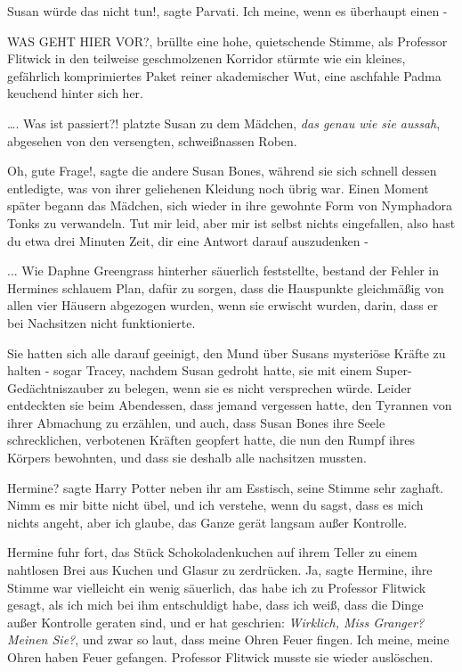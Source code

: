 \glqq{}Susan würde das nicht tun!\grqq{}, sagte Parvati. \glqq{}Ich meine, wenn es
überhaupt einen -\grqq{}

\glqq{}WAS GEHT HIER VOR?\grqq{}, brüllte eine hohe, quietschende Stimme, als
Professor Flitwick in den teilweise geschmolzenen Korridor stürmte wie ein
kleines, gefährlich komprimiertes Paket reiner akademischer Wut, eine aschfahle
Padma keuchend hinter sich her.

…. \glqq{}Was ist passiert?!\grqq{} platzte Susan zu dem Mädchen, \emph{das genau
wie sie aussah}, abgesehen von den versengten, schweißnassen Roben.

\glqq{}Oh, gute Frage!\grqq{}, sagte die andere Susan Bones, während sie sich
schnell dessen entledigte, was von ihrer geliehenen Kleidung noch übrig war.
Einen Moment später begann das Mädchen, sich wieder in ihre gewohnte Form von
Nymphadora Tonks zu verwandeln. \glqq{}Tut mir leid, aber mir ist selbst nichts
eingefallen, also hast du etwa drei Minuten Zeit, dir eine Antwort darauf
auszudenken -\grqq{}

... Wie Daphne Greengrass hinterher säuerlich feststellte, bestand der Fehler in
Hermines schlauem Plan, dafür zu sorgen, dass die Hauspunkte gleichmäßig von
allen vier Häusern abgezogen wurden, wenn sie erwischt wurden, darin, dass er
bei Nachsitzen nicht funktionierte.

Sie hatten sich alle darauf geeinigt, den Mund über Susans mysteriöse Kräfte zu
halten - sogar Tracey, nachdem Susan gedroht hatte, sie mit einem
Super-Gedächtniszauber zu belegen, wenn sie es nicht versprechen würde. Leider
entdeckten sie beim Abendessen, dass jemand vergessen hatte, den Tyrannen von
ihrer Abmachung zu erzählen, und auch, dass Susan Bones ihre Seele
schrecklichen, verbotenen Kräften geopfert hatte, die nun den Rumpf ihres
Körpers bewohnten, und dass sie deshalb alle nachsitzen mussten.

\glqq{}Hermine?\grqq{} sagte Harry Potter neben ihr am Esstisch, seine Stimme
sehr zaghaft. \glqq{}Nimm es mir bitte nicht übel, und ich verstehe, wenn du
sagst, dass es mich nichts angeht, aber ich glaube, das Ganze gerät langsam
außer Kontrolle.\grqq{}

Hermine fuhr fort, das Stück Schokoladenkuchen auf ihrem Teller zu einem
nahtlosen Brei aus Kuchen und Glasur zu zerdrücken. \glqq{}Ja\grqq{}, sagte
Hermine, ihre Stimme war vielleicht ein wenig säuerlich, \glqq{}das habe ich zu
Professor Flitwick gesagt, als ich mich bei ihm entschuldigt habe, dass ich
weiß, dass die Dinge außer Kontrolle geraten sind, und er hat geschrien:
\emph{Wirklich, Miss Granger? Meinen Sie?}\grqq{}, und zwar so laut, dass meine
Ohren Feuer fingen. Ich meine, meine Ohren haben Feuer gefangen. Professor
Flitwick musste sie wieder auslöschen.\grqq{}


